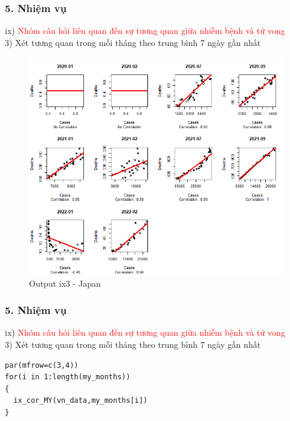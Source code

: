 \documentclass[english,10pt,table]{beamer}
\begin{document}
\begin{frame}[fragile]
\frametitle{5.  Nhiệm vụ}
ix) \textcolor{red}{Nhóm câu hỏi liên quan đến sự tương quan giữa nhiễm bệnh và tử vong}\\
3) Xét tương quan trong mỗi tháng theo trung bình 7 ngày gần nhất
	\begin{figure}[h!]
	\begin{center}
		    \includegraphics[scale = 0.36]{Images/IX/Indo (avg7).png}
		     \caption{Output ix3 - Japan}
		\end{center}
		\end{figure}
\end{frame}

\begin{frame}[fragile]
\frametitle{5.  Nhiệm vụ}
ix) \textcolor{red}{Nhóm câu hỏi liên quan đến sự tương quan giữa nhiễm bệnh và tử vong}\\
3) Xét tương quan trong mỗi tháng theo trung bình 7 ngày gần nhất
\lstset{
    title=Source code for Vietnam}
\begin{lstlisting}[frame=single]  
par(mfrow=c(3,4))
for(i in 1:length(my_months))
{
  ix_cor_MY(vn_data,my_months[i])
}
\end{lstlisting}
\end{frame}
\end{document}
